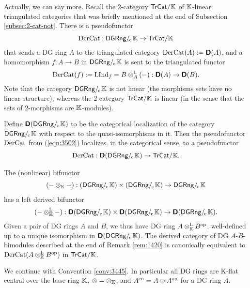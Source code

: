 \begin{rem} \label{rem:1421}
Actually, we can say more. 
Recall the $2$-category $\mathrm{\mathsf{TrCat}} / \mathbb{K}$ of $\mathbb{K}$-linear triangulated 
categories that was briefly mentioned at the end of Subsection 
\ref{subsec:2-cat-not}. 
There is a pseudofunctor 
\begin{equation} \label{eqn:3502}
\operatorname{DerCat} : \mathrm{\mathsf{DGRng}} /_{\mspace{-2mu} \mathrm{c}} \mspace{2mu} \mathbb{K} \to \mathrm{\mathsf{TrCat}} / \mathbb{K}
\end{equation}
that sends a DG ring $A$ to the triangulated category
$\operatorname{DerCat}(A) := \boldsymbol{\mathsf{D}}(A)$,
and a homomorphism $f : A \to B$ in $\mathrm{\mathsf{DGRng}} /_{\mspace{-2mu} \mathrm{c}} \mspace{2mu} \mathbb{K}$
is sent to the triangulated functor 
\[ \operatorname{DerCat}(f) := \operatorname{LInd}_f = B \otimes^{\mathrm{L}}_{A} (-)
: \boldsymbol{\mathsf{D}}(A) \to \boldsymbol{\mathsf{D}}(B) . \]
Note that the category $\mathrm{\mathsf{DGRng}} /_{\mspace{-2mu} \mathrm{c}} \mspace{2mu} \mathbb{K}$ is not linear (the morphisms 
sets have no linear structure), whereas the 
$2$-category $\mathrm{\mathsf{TrCat}} / \mathbb{K}$ is linear (in the sense that the sets of 
$2$-morphisms are $\mathbb{K}$-modules). 

Define $\boldsymbol{\mathsf{D}}(\mathrm{\mathsf{DGRng}} /_{\mspace{-2mu} \mathrm{c}} \mspace{2mu} \mathbb{K})$
to be the categorical localization of the category  
$\mathrm{\mathsf{DGRng}} /_{\mspace{-2mu} \mathrm{c}} \mspace{2mu} \mathbb{K}$ with respect to the quasi-isomorphisms in it. Then 
the pseudofunctor $\operatorname{DerCat}$ from (\ref{eqn:3502}) localizes, in the 
categorical sense, to a pseudofunctor
\[ \operatorname{DerCat} : \boldsymbol{\mathsf{D}}(\mathrm{\mathsf{DGRng}} /_{\mspace{-2mu} \mathrm{c}} \mspace{2mu} \mathbb{K}) \to \mathrm{\mathsf{TrCat}} / \mathbb{K} . \]

The (nonlinear) bifunctor 
\[ (- \otimes_{\mathbb{K}} -) : 
(\mathrm{\mathsf{DGRng}} /_{\mspace{-2mu} \mathrm{c}} \mspace{2mu} \mathbb{K}) \times (\mathrm{\mathsf{DGRng}} /_{\mspace{-2mu} \mathrm{c}} \mspace{2mu} \mathbb{K}) \to
\mathrm{\mathsf{DGRng}} /_{\mspace{-2mu} \mathrm{c}} \mspace{2mu} \mathbb{K} \]
has a left derived bifunctor 
\[ (- \otimes^{\mathrm{L}}_{\mathbb{K}} -) : 
\boldsymbol{\mathsf{D}}(\mathrm{\mathsf{DGRng}} /_{\mspace{-2mu} \mathrm{c}} \mspace{2mu} \mathbb{K}) \times 
\boldsymbol{\mathsf{D}}(\mathrm{\mathsf{DGRng}} /_{\mspace{-2mu} \mathrm{c}} \mspace{2mu} \mathbb{K}) \to 
\boldsymbol{\mathsf{D}}(\mathrm{\mathsf{DGRng}} /_{\mspace{-2mu} \mathrm{c}} \mspace{2mu} \mathbb{K}) . \]
Given a pair of DG rings $A$ and $B$, we thus have DG ring 
$A \otimes^{\mathrm{L}}_{\mathbb{K}} B^{\mathrm{op}}$, 
well-defined up to a unique isomorphism in 
$\boldsymbol{\mathsf{D}}(\mathrm{\mathsf{DGRng}} /_{\mspace{-2mu} \mathrm{c}} \mspace{2mu} \mathbb{K})$. 
The derived category of DG $A$-$B$-bimodules described at the end of Remark 
\ref{rem:1420} is canonically equivalent to 
$\operatorname{DerCat}(A \otimes^{\mathrm{L}}_{\mathbb{K}} B^{\mathrm{op}})$
in $\mathrm{\mathsf{TrCat}} / \mathbb{K}$. 
\end{rem}




 \label{subsec:tilting}

We continue with Convention \ref{conv:3445}. In particular all DG rings are 
K-flat central over the base ring $\mathbb{K}$, $\otimes = \otimes_{\mathbb{K}}$, 
and $A^{\mathrm{en}} = A \otimes A^{\mathrm{op}}$ for a DG ring $A$. 

